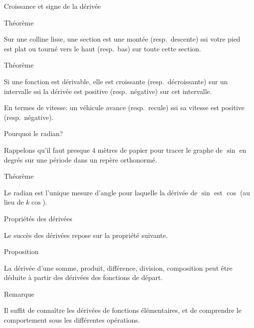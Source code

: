 \documentclass{beamer}
\begin{document}
\begin{frame}
    {Croissance et signe de la dérivée}

    \begin{exampleblock}
        {Théorème}

        Sur une colline lisse, une section est une montée (resp.\ descente) ssi votre pied est plat ou tourné vers le haut (resp.\ bas) sur toute cette section.
    \end{exampleblock}

    \pause{}

    \begin{alertblock}
        {Théorème}

        Si une fonction est dérivable, elle est croissante (resp.\ décroissante) sur un intervalle ssi la dérivée est positive (resp.\ négative) sur cet intervalle.
    \end{alertblock}

    \pause{}
    En termes de vitesse: un véhicule avance (resp.\ recule) ssi sa vitesse est positive (resp.\ négative).
\end{frame}

\begin{frame}
    {Pourquoi le radian?}

    Rappelons qu'il faut presque $4$ mètres de papier pour tracer le graphe de $\sin$ en degrés sur une période dans un repère orthonormé.
    \pause{}

    \begin{exampleblock}
        {Théorème}

        Le radian est l'unique mesure d'angle pour laquelle la dérivée de $\sin$ est $\cos$ (au lieu de $k \cos$).
    \end{exampleblock}
\end{frame}

\begin{frame}
    {Propriétés des dérivées}

    Le succès des dérivées repose sur la propriété suivante.
    \begin{exampleblock}
        {Proposition}

        La dérivée d'une somme, produit, différence, division, composition peut être déduite à partir des dérivées des fonctions de départ.
    \end{exampleblock}
    \pause{}

    \begin{alertblock}
        {Remarque}

        Il suffit de connaître les dérivées de fonctions élémentaires,
        et de comprendre le comportement sous les différentes opérations.
    \end{alertblock}
\end{frame}
\end{document}
